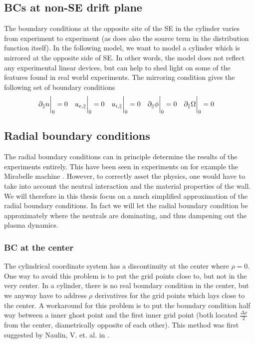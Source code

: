 \subsection{BCs at non-SE drift plane}
The boundary conditions at the opposite site of the SE in the cylinder varies
from experiment to experiment (as does also the source term in the distribution
function itself). In the following model, we want to model a cylinder which is
mirrored at the opposite side of SE. In other words, the model does not reflect
any experimental linear devices, but can help to shed light on some of the
features found in real world experiments. The mirroring condition gives the
following set of boundary conditions
%
\begin{align*}
    &\partial_\| n \bigg|_0    =0 &
    &u_{e,\|} \bigg|_0         =0 &
    &u_{i,\|} \bigg|_0         =0 &
    &\partial_\| \phi \bigg|_0 =0 &
    &\partial_\|\Omega \bigg|_0   =0 &
\end{align*}


\subsection{Radial boundary conditions}
%
The radial boundary conditions can in principle determine the results of the
experiments entirely. This have been seen in experiments on for example the
Mirabelle machine \cite{Schroder2001}. However, to correctly asset the physics,
one would have to take into account the neutral interaction and the material
properties of the wall. We will therefore in this thesis focus on a much
simplified approximation of the radial boundary conditions. In fact we will let
the radial boundary condition be approximately where the neutrals are
dominating, and thus dampening out the plasma dynamics.

\subsubsection{BC at the center}
%
The cylindrical coordinate system has a discontinuity at the center where
$\rho=0$. One way to avoid this problem is to put the grid points close to, but
not in the very center. In a cylinder, there is no real boundary condition in
the center, but we anyway have to address $\rho$ derivatives for the grid
points which lays close to the center. A workaround for this problem is to put
the boundary condition half way between a inner ghost point and the first inner
grid point (both located $\frac{\Delta \rho}{2}$ from the center, diametrically
opposite of each other). This method was first suggested by Naulin, V. et. al.
in \cite{Naulin2008}.

